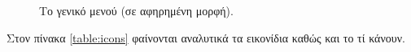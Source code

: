 \documentclass[a4paper,titlepage,twoside,12pt,leqno]{article}
\begin{document}
\begin{figure}
\begin{center}
\caption{Το γενικό μενού (σε αφηρημένη μορφή).}
\label{fig:menu:general}
\end{center}
\end{figure}

Στον πίνακα \ref{table:icons} φαίνονται αναλυτικά τα εικονίδια καθώς και το τί κάνουν.
\end{document}
